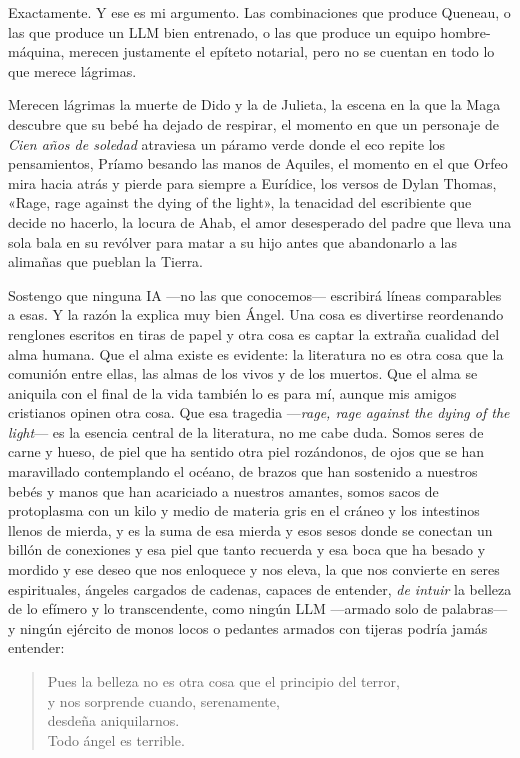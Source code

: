 \documentclass[11pt,a4paper]{article}
\begin{document}
Exactamente. Y ese es mi argumento. Las combinaciones que produce Queneau, o las que produce un LLM bien entrenado, o las que produce un equipo hombre-máquina, merecen justamente el epíteto notarial, pero no se cuentan en todo lo que merece lágrimas.

Merecen lágrimas la muerte de Dido y la de Julieta, la escena en la que la Maga descubre que su bebé ha dejado de respirar, el momento en que un personaje de \emph{Cien años de soledad} atraviesa un páramo verde donde el eco repite los pensamientos, Príamo besando las manos de Aquiles, el momento en el que Orfeo mira hacia atrás y pierde para siempre a Eurídice, los versos de Dylan Thomas, «Rage, rage against the dying of the light», la tenacidad del escribiente que decide no hacerlo, la locura de Ahab, el amor desesperado del padre que lleva una sola bala en su revólver para matar a su hijo antes que abandonarlo a las alimañas que pueblan la Tierra.

Sostengo que ninguna IA ---no las que conocemos--- escribirá líneas comparables a esas. Y la razón la explica muy bien Ángel. Una cosa es divertirse reordenando renglones escritos en tiras de papel y otra cosa es captar la extraña cualidad del alma humana. Que el alma existe es evidente: la literatura no es otra cosa que la comunión entre ellas, las almas de los vivos y de los muertos. Que el alma se aniquila con el final de la vida también lo es para mí, aunque mis amigos cristianos opinen otra cosa. Que esa tragedia ---\emph{rage, rage against the dying of the light}--- es la esencia central de la literatura, no me cabe duda. Somos seres de carne y hueso, de piel que ha sentido otra piel rozándonos, de ojos que se han maravillado contemplando el océano, de brazos que han sostenido a nuestros bebés y manos que han acariciado a nuestros amantes, somos sacos de protoplasma con un kilo y medio de materia gris en el cráneo y los intestinos llenos de mierda, y es la suma de esa mierda y esos sesos donde se conectan un billón de conexiones y esa piel que tanto recuerda y esa boca que ha besado y mordido y ese deseo que nos enloquece y nos eleva, la que nos convierte en seres espirituales, ángeles cargados de cadenas, capaces de entender, \emph{de intuir} la belleza de lo efímero y lo transcendente, como ningún LLM ---armado solo de palabras--- y ningún ejército de monos locos o pedantes armados con tijeras podría jamás entender:

\begin{verse}
Pues la belleza no es otra cosa que el principio del terror,\\
y nos sorprende cuando, serenamente,\\
desdeña aniquilarnos.\\
Todo ángel es terrible.
\end{verse}
\end{document}

